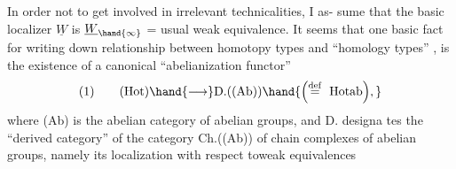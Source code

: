 In order not to get involved in irrelevant technicalities, I as-%
sume that the basic localizer $\underline{W}$ is $\underline{W}_{\hand{\infty}}$ = usual weak equivalence. It
seems that  one basic fact  for writing down relationship
between homotopy types and ``homology types'' , is the existence of a
canonical ``abelianization functor''
\[
\text{(1)}\qquad (\mathrm{Hot}) \hand{\longrightarrow} \mathrm{D.}((\mathrm{Ab}))\hand{\Bigl(\overset{\mathrm{def}}{=}\ \mathrm{Hotab}\Bigr),}
\]
where (Ab) is the abelian category of abelian groups, and D. designa%
tes the ``derived category'' of  the category
Ch.((Ab)) of chain complexes of abelian groups, namely its localization
with respect toweak equivalences 


